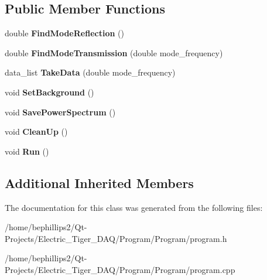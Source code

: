 \subsection*{Public Member Functions}
\begin{DoxyCompactItemize}
\item 
double {\bfseries Find\+Mode\+Reflection} ()\hypertarget{class_program_ac7df98dd886842fac83510e93ea5fe5d}{}\label{class_program_ac7df98dd886842fac83510e93ea5fe5d}

\item 
double {\bfseries Find\+Mode\+Transmission} (double mode\+\_\+frequency)\hypertarget{class_program_adf22f71e6ad186b83e4b24e28d864f20}{}\label{class_program_adf22f71e6ad186b83e4b24e28d864f20}

\item 
data\+\_\+list {\bfseries Take\+Data} (double mode\+\_\+frequency)\hypertarget{class_program_acc23df69238a22a4f5ae2bec1dfd91b0}{}\label{class_program_acc23df69238a22a4f5ae2bec1dfd91b0}

\item 
void {\bfseries Set\+Background} ()\hypertarget{class_program_a78db72195c82c70adf46fff6b10bf667}{}\label{class_program_a78db72195c82c70adf46fff6b10bf667}

\item 
void {\bfseries Save\+Power\+Spectrum} ()\hypertarget{class_program_a95d5bbc74eac1e35266607bc6fa4ad2c}{}\label{class_program_a95d5bbc74eac1e35266607bc6fa4ad2c}

\item 
void {\bfseries Clean\+Up} ()\hypertarget{class_program_a77e4065c8ca5dffc4c1029612376fcb3}{}\label{class_program_a77e4065c8ca5dffc4c1029612376fcb3}

\item 
void {\bfseries Run} ()\hypertarget{class_program_ab73390c4cc140df2fb4bbedb245352f9}{}\label{class_program_ab73390c4cc140df2fb4bbedb245352f9}

\end{DoxyCompactItemize}
\subsection*{Additional Inherited Members}


The documentation for this class was generated from the following files\+:\begin{DoxyCompactItemize}
\item 
/home/bephillips2/\+Qt-\/\+Projects/\+Electric\+\_\+\+Tiger\+\_\+\+D\+A\+Q/\+Program/\+Program/program.\+h\item 
/home/bephillips2/\+Qt-\/\+Projects/\+Electric\+\_\+\+Tiger\+\_\+\+D\+A\+Q/\+Program/\+Program/program.\+cpp\end{DoxyCompactItemize}

